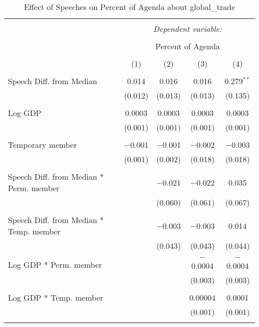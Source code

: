 
\begin{table}[!htbp] \centering 
  \caption{Effect of Speeches on Percent of Agenda about global_trade} 
  \label{} 
\begin{tabular}{@{\extracolsep{5pt}}lcccc} 
\\[-1.8ex]\hline 
\hline \\[-1.8ex] 
 & \multicolumn{4}{c}{\textit{Dependent variable:}} \\ 
\cline{2-5} 
\\[-1.8ex] & \multicolumn{4}{c}{Percent of Agenda} \\ 
\\[-1.8ex] & (1) & (2) & (3) & (4)\\ 
\hline \\[-1.8ex] 
 Speech Diff. from Median & 0.014 & 0.016 & 0.016 & 0.279$^{**}$ \\ 
  & (0.012) & (0.013) & (0.013) & (0.135) \\ 
  & & & & \\ 
 Log GDP & 0.0003 & 0.0003 & 0.0003 & 0.0003 \\ 
  & (0.001) & (0.001) & (0.001) & (0.001) \\ 
  & & & & \\ 
 Temporary member & $-$0.001 & $-$0.001 & $-$0.002 & $-$0.003 \\ 
  & (0.001) & (0.002) & (0.018) & (0.018) \\ 
  & & & & \\ 
 Speech Diff. from Median * Perm. member &  & $-$0.021 & $-$0.022 & 0.035 \\ 
  &  & (0.060) & (0.061) & (0.067) \\ 
  & & & & \\ 
 Speech Diff. from Median * Temp. member &  & $-$0.003 & $-$0.003 & 0.014 \\ 
  &  & (0.043) & (0.043) & (0.044) \\ 
  & & & & \\ 
 Log GDP * Perm. member &  &  & $-$0.0004 & $-$0.0004 \\ 
  &  &  & (0.003) & (0.003) \\ 
  & & & & \\ 
 Log GDP * Temp. member &  &  & 0.00004 & 0.0001 \\ 
  &  &  & (0.001) & (0.001) \\ 
  & & & & \\ 

\end{tabular}
\end{table}
